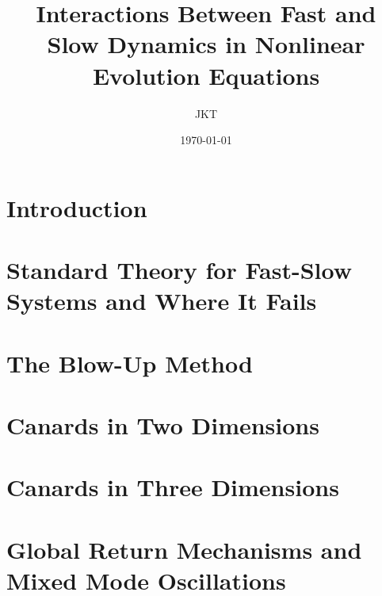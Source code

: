 \documentclass{article}
\title{Interactions Between Fast and Slow Dynamics in Nonlinear Evolution Equations}
\author{JKT}
\date{\today}
\begin{document}
\maketitle
\newpage
{} %
\tableofcontents
\listoffigures

\newpage
{} %
\pagestyle{fancy}

\begin{abstract}
	
\end{abstract}


\section{Introduction}\label{Intro}


\section{Standard Theory for Fast-Slow Systems and Where It Fails} \label{GSPT}


%


\section{The Blow-Up Method}\label{sec: VDP Blowup}


\section{Canards in Two Dimensions}\label{sec:canard-points}



\section{Canards in Three Dimensions} \label{sec: threedimfolds}



\section{Global Return Mechanisms and Mixed Mode Oscillations}\label{sec:MMO}

\end{document}
